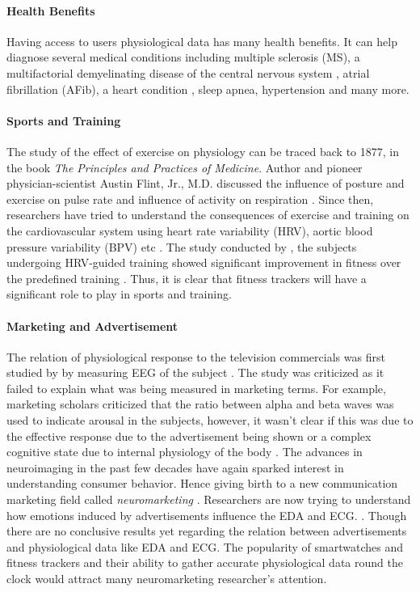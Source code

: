 \paragraph{Health Benefits} Having access to users physiological data has many health benefits. It can help diagnose several medical conditions including multiple sclerosis (MS), a multifactorial demyelinating disease of the central nervous system \cite{sparaco_role_2018}, atrial fibrillation (AFib), a heart condition \cite{nemati_monitoring_2016}, sleep apnea, hypertension \cite{tison_geoffrey_h_abstract_2017} and many more.

\paragraph{Sports and Training} The study of the effect of exercise on physiology can be traced back to 1877, in the book \textit{The Principles and Practices of Medicine}. Author and pioneer physician-scientist Austin Flint, Jr., M.D. discussed the influence of posture and exercise on pulse rate and influence of activity on respiration \cite{mcardle_essentials_2006}. Since then, researchers have tried to understand the consequences of exercise and training on the cardiovascular system using heart rate variability (HRV), aortic blood pressure variability (BPV) etc \cite{aubert_heart_2003}. The study conducted by \citeauthor{vesterinen_individual_2016}, the subjects undergoing HRV-guided training showed significant improvement in fitness over the predefined training \cite{vesterinen_individual_2016}. Thus, it is clear that fitness trackers will have a significant role to play in sports and training.

\paragraph{Marketing and Advertisement} The relation of physiological response to the television commercials was first studied by \citeauthor{522761019710201} by measuring EEG of the subject \cite{522761019710201}. The study was criticized as it failed to explain what was being measured in marketing terms. For example, marketing scholars criticized that the ratio between alpha and beta waves was used to indicate arousal in the subjects, however, it wasn't clear if this was due to the effective response due to the advertisement being shown or a complex cognitive state due to internal physiology of the body \cite{1907543419840330}. The advances in neuroimaging in the past few decades have again sparked interest in understanding consumer behavior. Hence giving birth to a new communication marketing field called \textit{neuromarketing} \cite{ait_hammou_contributions_2013}. Researchers are now trying to understand how emotions induced by advertisements influence the EDA and ECG. \cite{baraybar-fernandez_evaluation_2017}. Though there are no conclusive results yet regarding the relation between advertisements and physiological data like EDA and ECG. The popularity of smartwatches and fitness trackers and their ability to gather accurate physiological data round the clock would attract many neuromarketing researcher's attention.


